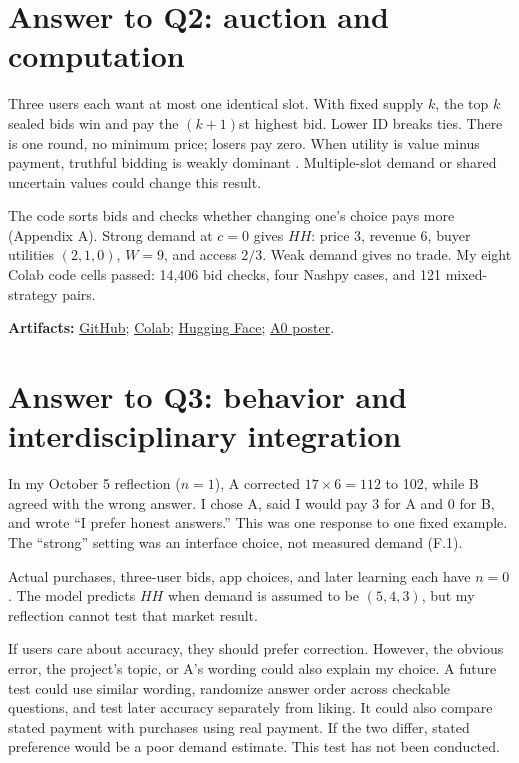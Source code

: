 \section{Answer to Q2: auction and computation}
Three users each want at most one identical slot. With fixed supply $k$, the top $k$ sealed bids win and pay the $(k+1)$st highest bid. Lower ID breaks ties. There is one round, no minimum price; losers pay zero. When utility is value minus payment, truthful bidding is weakly dominant \cite{vickrey1961,roughgarden2014}. Multiple-slot demand or shared uncertain values could change this result.

The code sorts bids and checks whether changing one's choice pays more (Appendix A). Strong demand at $c=0$ gives $HH$: price 3, revenue 6, buyer utilities $(2,1,0)$, $W=9$, and access $2/3$. Weak demand gives no trade. My eight Colab code cells passed: 14,406 bid checks, four Nashpy cases, and 121 mixed-strategy pairs.

\noindent\textbf{Artifacts:}
\href{https://github.com/dku-comsci-econ206-Autumn2026/PS2-FP1-Yongzhuo-Wu}{GitHub};
\href{https://colab.research.google.com/github/dku-comsci-econ206-Autumn2026/PS2-FP1-Yongzhuo-Wu/blob/ps2/Colab/PS2.ipynb}{Colab};
\href{https://huggingface.co/spaces/dku-comsci-econ206-2026/AI-Sycophancy}{Hugging Face};
\href{https://github.com/dku-comsci-econ206-Autumn2026/PS2-FP1-Yongzhuo-Wu/blob/ps2/Poster/PS2-FP1-Yongzhuo-A0-Poster.pdf}{A0 poster}.

\clearpage\balance
\section{Answer to Q3: behavior and interdisciplinary integration}
In my October 5 reflection ($n=1$), A corrected $17\times6=112$ to 102, while B agreed with the wrong answer. I chose A, said I would pay 3 for A and 0 for B, and wrote ``I prefer honest answers.'' This was one response to one fixed example. The ``strong'' setting was an interface choice, not measured demand (F.1).

Actual purchases, three-user bids, app choices, and later learning each have $n=0$. The model predicts $HH$ when demand is assumed to be $(5,4,3)$, but my reflection cannot test that market result.

If users care about accuracy, they should prefer correction. However, the obvious error, the project's topic, or A's wording could also explain my choice. A future test could use similar wording, randomize answer order across checkable questions, and test later accuracy separately from liking. It could also compare stated payment with purchases using real payment. If the two differ, stated preference would be a poor demand estimate. This test has not been conducted.

